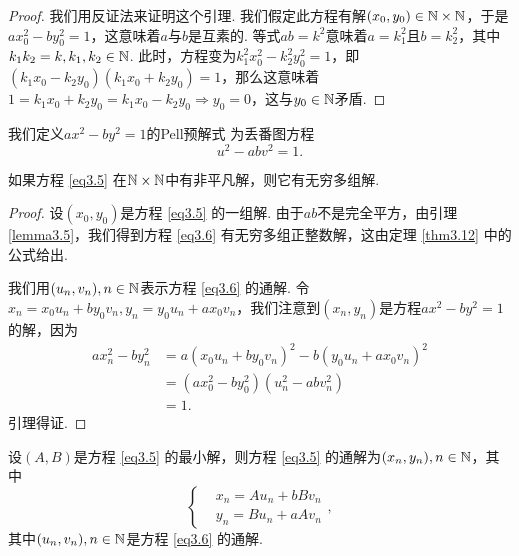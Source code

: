 \begin{proof}
  我们用反证法来证明这个引理. 我们假定此方程有解$(x_0,y_0)\in\mathbb N\times\mathbb N$，于是$ax_0^2-by_0^2=1$，这意味着$a$与$b$是互素的. 等式$ab=k^2$意味着$a=k_1^2$且$b=k_2^2$，其中$k_1k_2=k,k_1,k_2\in\mathbb N$. 此时，方程变为$k_1^2x_0^2-k_2^2y_0^2=1$，即$(k_1x_0-k_2y_0)(k_1x_0+k_2y_0)=1$，那么这意味着$1=k_1x_0+k_2y_0=k_1x_0-k_2y_0\Rightarrow y_0=0$，这与$y_0\in\mathbb N$矛盾.
\end{proof}

我们定义$ax^2-by^2=1$的{\kaishu Pell预解式} 为丢番图方程
\begin{equation}\label{eq3.6}
  u^2 - ab v^2 = 1.
\end{equation}

\begin{lemma}
  如果方程 \eqref{eq3.5} 在$\mathbb N\times\mathbb N$中有非平凡解，则它有无穷多组解.
\end{lemma}

\begin{proof}
  设$(x_0,y_0)$是方程 \eqref{eq3.5} 的一组解. 由于$ab$不是完全平方，由引理 \ref{lemma3.5}，我们得到方程 \eqref{eq3.6} 有无穷多组正整数解，这由定理 \ref{thm3.12} 中的公式给出.

  我们用$(u_n,v_n),n\in\mathbb N$表示方程 \eqref{eq3.6} 的通解. 令$x_n=x_0u_n+by_0v_n,y_n=y_0u_n+ax_0v_n$，我们注意到$(x_n,y_n)$是方程$ax^2-by^2=1$的解，因为
  \begin{align*}
    ax_n^2 - by_n^2 & = a(x_0u_n + by_0v_n)^2 - b(y_0u_n + ax_0v_n)^2 \\
    & = (ax_0^2 - by_0^2) (u_n^2 - abv_n^2) \\
    & = 1.
  \end{align*}
  引理得证.
\end{proof}

\begin{theorem}
  设$(A,B)$是方程 \eqref{eq3.5} 的最小解，则方程 \eqref{eq3.5} 的通解为$(x_n,y_n),n\in\mathbb N$，其中
  \[
    \left\{
      \begin{aligned}
        & x_n = Au_n + bBv_n \\
        & y_n = Bu_n + aAv_n
      \end{aligned}
    \right.,
  \]
  其中$(u_n,v_n),n\in\mathbb N$是方程 \eqref{eq3.6} 的通解.
\end{theorem}

